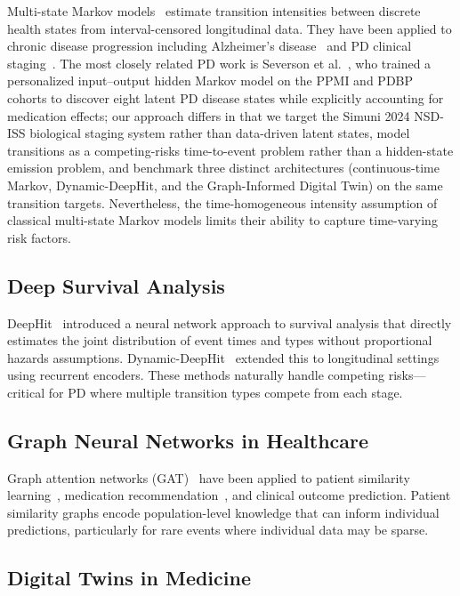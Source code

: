 Multi-state Markov models~\cite{jackson2011} estimate transition intensities between discrete health states from interval-censored longitudinal data. They have been applied to chronic disease progression including Alzheimer's disease~\cite{cook2018} and PD clinical staging~\cite{ypma2022}. The most closely related PD work is Severson et al.~\cite{severson2021}, who trained a personalized input--output hidden Markov model on the PPMI and PDBP cohorts to discover eight latent PD disease states while explicitly accounting for medication effects; our approach differs in that we target the Simuni 2024 NSD-ISS biological staging system rather than data-driven latent states, model transitions as a competing-risks time-to-event problem rather than a hidden-state emission problem, and benchmark three distinct architectures (continuous-time Markov, Dynamic-DeepHit, and the Graph-Informed Digital Twin) on the same transition targets. Nevertheless, the time-homogeneous intensity assumption of classical multi-state Markov models limits their ability to capture time-varying risk factors.

\subsection{Deep Survival Analysis}

DeepHit~\cite{lee2018} introduced a neural network approach to survival analysis that directly estimates the joint distribution of event times and types without proportional hazards assumptions. Dynamic-DeepHit~\cite{lee2019} extended this to longitudinal settings using recurrent encoders. These methods naturally handle competing risks---critical for PD where multiple transition types compete from each stage.

\subsection{Graph Neural Networks in Healthcare}

Graph attention networks (GAT)~\cite{velickovic2018} have been applied to patient similarity learning~\cite{adamedgraph}, medication recommendation~\cite{shang2019}, and clinical outcome prediction. Patient similarity graphs encode population-level knowledge that can inform individual predictions, particularly for rare events where individual data may be sparse.

\subsection{Digital Twins in Medicine}

